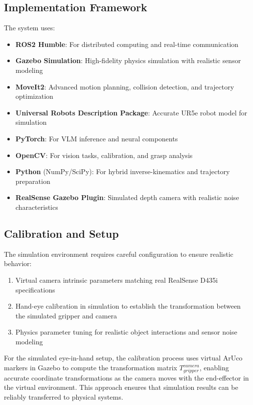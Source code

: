 \documentclass[conference]{IEEEtran}
\begin{document}
\subsection{Implementation Framework}
The system uses:
\begin{itemize}
    \item \textbf{ROS2 Humble}: For distributed computing and real-time communication
    \item \textbf{Gazebo Simulation}: High-fidelity physics simulation with realistic sensor modeling
    \item \textbf{MoveIt2}: Advanced motion planning, collision detection, and trajectory optimization
    \item \textbf{Universal Robots Description Package}: Accurate UR5e robot model for simulation
    \item \textbf{PyTorch}: For VLM inference and neural components
    \item \textbf{OpenCV}: For vision tasks, calibration, and grasp analysis
    \item \textbf{Python} (NumPy/SciPy): For hybrid inverse-kinematics and trajectory preparation
    \item \textbf{RealSense Gazebo Plugin}: Simulated depth camera with realistic noise characteristics
\end{itemize}

\subsection{Calibration and Setup}
The simulation environment requires careful configuration to ensure realistic behavior:
\begin{enumerate}
    \item Virtual camera intrinsic parameters matching real RealSense D435i specifications
    \item Hand-eye calibration in simulation to establish the transformation between the simulated gripper and camera
    \item Physics parameter tuning for realistic object interactions and sensor noise modeling
\end{enumerate}

For the simulated eye-in-hand setup, the calibration process uses virtual ArUco markers in Gazebo to compute the transformation matrix $T_{gripper}^{camera}$, enabling accurate coordinate transformations as the camera moves with the end-effector in the virtual environment. This approach ensures that simulation results can be reliably transferred to physical systems.
\end{document}
